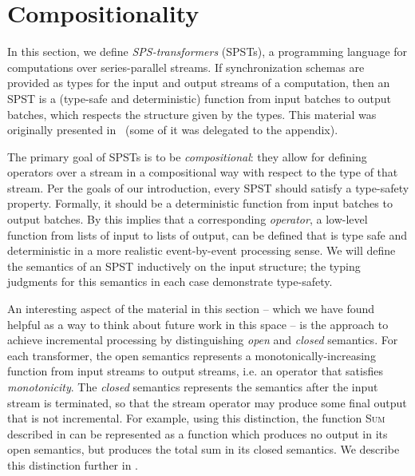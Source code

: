 \chapter{Compositionality}
\label{cha:composition}

In this section, we define \emph{SPS-transformers} (SPSTs), a programming language for computations over series-parallel streams.
If synchronization schemas are provided as types for the input and output streams of a computation,
then an SPST is a (type-safe and deterministic) function from input batches to output batches, which respects the structure given by the types. This material was originally presented in~ (some of it was delegated to the appendix).

The primary goal of SPSTs is to be \emph{compositional}: they allow for defining operators over a stream in a compositional way with respect to the type of that stream.
Per the goals of our introduction, every SPST should satisfy a type-safety property.
Formally, it should be a deterministic function from input batches to output batches.
By  this implies that a corresponding \emph{operator}, a low-level function from lists of input to lists of output, can be defined that is type safe and deterministic
in a more realistic event-by-event processing sense.
We will define the semantics of an SPST inductively on the input structure; the typing judgments for this semantics in each case demonstrate type-safety.

An interesting aspect of the material in this section -- which we have found helpful as a way to think about future work in this space -- is the approach to achieve incremental processing by distinguishing \emph{open} and \emph{closed} semantics. For each transformer, the open semantics represents a monotonically-increasing function from input streams to output streams, i.e. an operator that satisfies \emph{monotonicity}. The \emph{closed} semantics represents the semantics after the input stream is terminated, so that the stream operator may produce some final output that is not incremental.
For example, using this distinction, the function \textsc{Sum} described in  can be represented as a function which produces no output in its open semantics, but produces the total sum in its closed semantics.
We describe this distinction further in .

